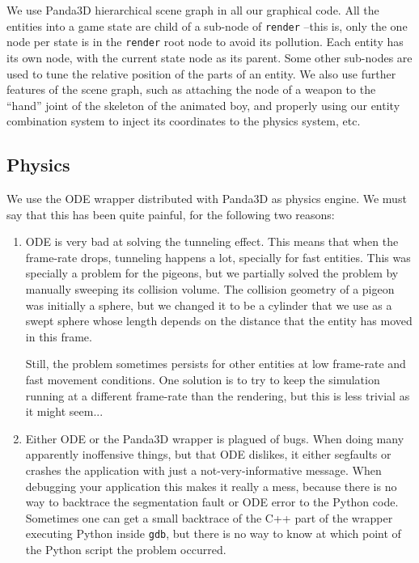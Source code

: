 \documentclass[a4paper,10pt]{article}
\begin{document}
We use Panda3D hierarchical scene graph in all our graphical code. All
the entities into a game state are child of a sub-node of
\texttt{render} --this is, only the one node per state is in the
\texttt{render} root node to avoid its pollution. Each entity has its
own node, with the current state node as its parent. Some other
sub-nodes are used to tune the relative position of the parts of an
entity. We also use further features of the scene graph, such as
attaching the node of a weapon to the ``hand'' joint of the skeleton
of the animated boy, and properly using our entity combination system
to inject its coordinates to the physics system, etc.

\subsection{Physics}

We use the ODE wrapper distributed with Panda3D as physics engine. We
must say that this has been quite painful, for the following two
reasons:

\begin{enumerate}
\item ODE is very bad at solving the tunneling effect. This means that
  when the frame-rate drops, tunneling happens a lot, specially for
  fast entities. This was specially a problem for the pigeons, but we
  partially solved the problem by manually sweeping its collision
  volume\cite{ericson05collision}. The collision geometry of a pigeon was
  initially a sphere, but we changed it to be a cylinder that we use
  as a swept sphere whose length depends on the distance that the
  entity has moved in this frame.

  Still, the problem sometimes persists for other entities at low
  frame-rate and fast movement conditions. One solution is to try to
  keep the simulation running at a different frame-rate than the
  rendering, but this is less trivial as it might seem...

\item Either ODE or the Panda3D wrapper is plagued of bugs. When doing
  many apparently inoffensive things, but that ODE dislikes, it
  either segfaults or crashes the application with just a
  not-very-informative message. When debugging your application this
  makes it really a mess, because there is no way to backtrace the
  segmentation fault or ODE error to the Python code. Sometimes one
  can get a small backtrace of the C++ part of the wrapper executing Python
  inside \texttt{gdb}, but there is no way to know at which point of
  the Python script the problem occurred.
\end{enumerate}
\end{document}

